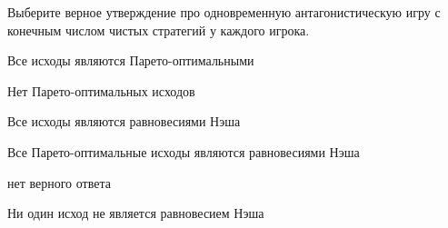 
\begin{question}
Выберите верное утверждение про одновременную антагонистическую игру с конечным числом чистых стратегий у каждого игрока.
\begin{answerlist}
  \item Все исходы являются Парето-оптимальными
  \item Нет Парето-оптимальных исходов
  \item Все исходы являются равновесиями Нэша
  \item Все Парето-оптимальные исходы являются равновесиями Нэша
  \item нет верного ответа
  \item Ни один исход не является равновесием Нэша
\end{answerlist}
\end{question}



